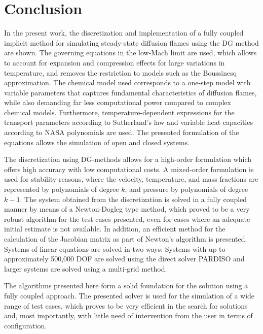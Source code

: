 \chapter{Conclusion}	\label{ch:conclusion}

In the present work, the discretization and implementation of a fully coupled implicit method for simulating steady-state diffusion flames using the DG method are shown. The governing equations in the low-Mach limit are used, which allows to account for expansion and compression effects for large variations in temperature, and removes the restriction to models such as the Boussinesq approximation. The chemical model used corresponds to a one-step model with variable parameters that captures fundamental characteristics of diffusion flames, while also demanding far less computational power compared to complex chemical models. Furthermore, temperature-dependent expressions for the transport parameters according to Sutherland's law and variable heat capacities according to NASA polynomials are used. The presented formulation of the equations allows the simulation of open and closed systems. 

The discretization using DG-methods allows for a high-order formulation which offers high accuracy with low computational costs. A mixed-order formulation is used for stability reasons, where the velocity, temperature, and mass fractions are represented by polynomials of degree $k$, and pressure by polynomials of degree $k-1$. The system obtained from the discretization is solved in a fully coupled manner by means of a Newton-Dogleg type method, which proved to be a very robust algorithm for the test cases presented, even for cases where an adequate initial estimate is not available. In addition, an efficient method for the calculation of the Jacobian matrix as part of Newton's algorithm is presented. Systems of linear equations are solved in two ways: Systems with up to approximately 500,000 \gls{DOF} are solved using the direct solver \gls{PARDISO} and larger systems are solved using a multi-grid method. 

The algorithms presented here form a solid foundation for the solution using a fully coupled approach. The presented solver is used for the simulation of a wide range of test cases, which proves to be very efficient in the search for solutions and, most importantly, with little need of intervention from the user in terms of configuration.

